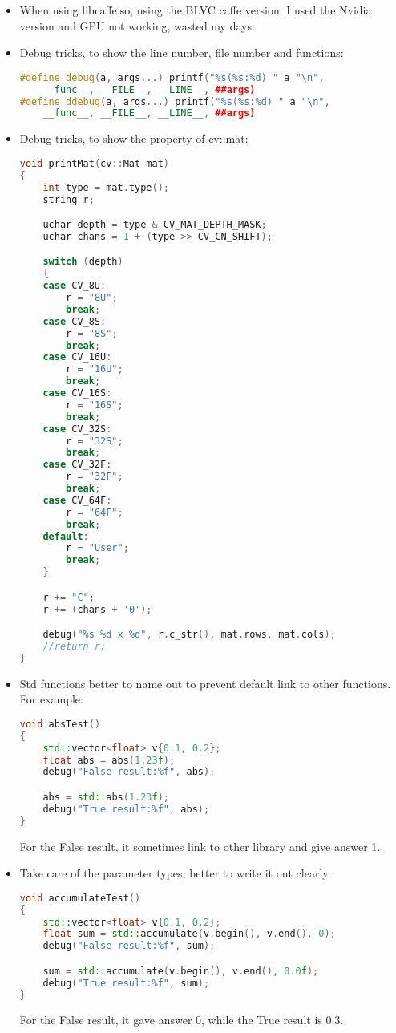 \documentclass[12pt]{article}
\numberwithin{equation}{section}
\begin{document}
{\begin{itemize}
	\item When using libcaffe.so, using the BLVC caffe version. I used the Nvidia version and GPU 
	not working, wasted my days.
	\item Debug tricks, to show the line number, file number and functions:
		\begin{lstlisting}[language=C++]
#define debug(a, args...) printf("%s(%s:%d) " a "\n", 
	__func__, __FILE__, __LINE__, ##args)
#define ddebug(a, args...) printf("%s(%s:%d) " a "\n", 
	__func__, __FILE__, __LINE__, ##args)
		\end{lstlisting}
	\item Debug tricks, to show the property of cv::mat:
		\begin{lstlisting}[language=C++]
void printMat(cv::Mat mat)
{
	int type = mat.type();
	string r;

	uchar depth = type & CV_MAT_DEPTH_MASK;
	uchar chans = 1 + (type >> CV_CN_SHIFT);

	switch (depth)
	{
	case CV_8U:
		r = "8U";
		break;
	case CV_8S:
		r = "8S";
		break;
	case CV_16U:
		r = "16U";
		break;
	case CV_16S:
		r = "16S";
		break;
	case CV_32S:
		r = "32S";
		break;
	case CV_32F:
		r = "32F";
		break;
	case CV_64F:
		r = "64F";
		break;
	default:
		r = "User";
		break;
	}

	r += "C";
	r += (chans + '0');

	debug("%s %d x %d", r.c_str(), mat.rows, mat.cols);
	//return r;
}
		\end{lstlisting}		
	\item Std functions better to name out to prevent default link to other functions. 
	For example: 
		\begin{lstlisting}[language=C++]
void absTest()
{
	std::vector<float> v{0.1, 0.2};
	float abs = abs(1.23f);
	debug("False result:%f", abs);

	abs = std::abs(1.23f);
	debug("True result:%f", abs);
}
		\end{lstlisting}
	For the False result, it sometimes link to other library and give answer 1.
	\item Take care of the parameter types, better to write it out clearly.
		\begin{lstlisting}[language=C++]
void accumulateTest()
{
	std::vector<float> v{0.1, 0.2};
	float sum = std::accumulate(v.begin(), v.end(), 0);
	debug("False result:%f", sum);

	sum = std::accumulate(v.begin(), v.end(), 0.0f);
	debug("True result:%f", sum);
}
		\end{lstlisting}
	For the False result, it gave answer 0, while the True result is 0.3.
\end{itemize}


}
\end{document}
